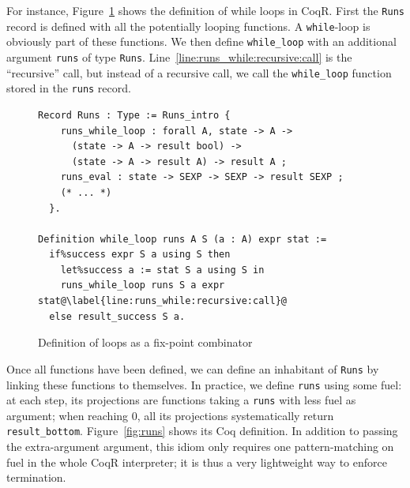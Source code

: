 \documentclass[
    sigplan,
    10pt,
    review, %
    natbib=false %
 ]{acmart}
\newcommand\mb[1]{\todo[color=purple!20,size=\scriptsize]{#1}}
\newcommand\mbi[1]{\todo[color=purple!20,inline]{#1}}
\newcommand\CoqR{CoqR}
\begin{document}
For instance, Figure~\ref{fig:while_loop} shows the definition
of while loops in \CoqR{}.
First the \texttt{Runs} record is defined
with all the potentially looping functions.
A \texttt{while}-loop is obviously part of these functions.
We then define \texttt{while_loop} with an additional
argument \texttt{runs} of type \texttt{Runs}.
Line~\ref{line:runs_while:recursive:call} is the ``recursive'' call,
but instead of a recursive call,
we call the \texttt{while_loop} function stored
in the \texttt{runs} record.

\begin{figure}
\begin{verbatim}
Record Runs : Type := Runs_intro {
    runs_while_loop : forall A, state -> A ->
      (state -> A -> result bool) ->
      (state -> A -> result A) -> result A ;
    runs_eval : state -> SEXP -> SEXP -> result SEXP ;
    (* ... *)
  }.

Definition while_loop runs A S (a : A) expr stat :=
  if%success expr S a using S then
    let%success a := stat S a using S in
    runs_while_loop runs S a expr stat@\label{line:runs_while:recursive:call}@
  else result_success S a.
\end{verbatim}
\vspace{-1em}
    \caption{Definition of loops as a fix-point combinator}
    \label{fig:while_loop}
\end{figure}

Once all functions have been defined,
we can define an inhabitant of \texttt{Runs}
by linking these functions to themselves.
In practice, we define \texttt{runs} using some fuel:
at each step, its projections are functions taking a \texttt{runs}
with less fuel as argument;
when reaching \(0\), all its projections systematically return \texttt{result_bottom}.
Figure~\ref{fig:runs} shows its Coq definition.
%
In addition to passing the extra-argument argument, this idiom only requires one pattern-matching on fuel in the whole \CoqR{} interpreter; it is thus a very lightweight way to enforce termination.
\end{document}
